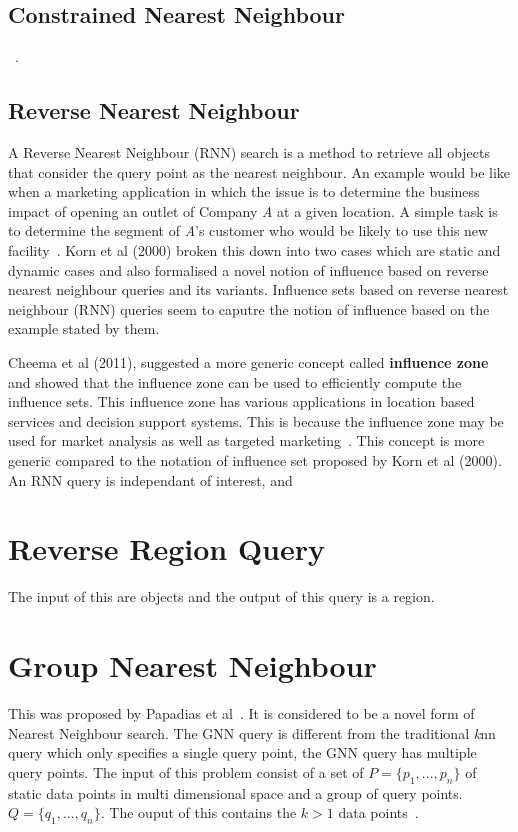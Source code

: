 \documentclass[a4paper,11pt]{article}
\begin{document}
\subsection{Constrained Nearest Neighbour}

~\cite{ferhatosmanoglu2001constrained}.

\subsection{Reverse Nearest Neighbour}

A Reverse Nearest Neighbour (RNN) search is a method to retrieve all objects
that consider the query point as the nearest neighbour. An example would be
like when a marketing application in which the issue is to determine the
business impact of opening an outlet of Company \textit{A} at a given
location. A simple task is to determine the segment of \textit{A}'s customer
who would be likely to use this new facility~\cite{korn2000influence}. Korn et
al (2000) broken this down into two cases which are static and dynamic cases
and also formalised a novel notion of influence based on reverse nearest
neighbour queries and its variants. Influence sets based on reverse nearest
neighbour (RNN) queries seem to caputre the notion of influence based on the
example stated by them.

Cheema et al (2011), suggested a more generic concept called \textbf{influence
zone} and showed that the influence zone can be used to efficiently compute
the influence sets. This influence zone has various applications in location
based services and decision support systems. This is because the influence
zone may be used for market analysis as well as targeted
marketing~\cite{cheema2011influence}. This concept is more generic compared to
the notation of influence set proposed by Korn et al (2000). An RNN query is
independant of interest, and

\section{Reverse Region Query}

The input of this are objects and the output of this query is a region. 

\section{Group Nearest Neighbour} 

This was proposed by Papadias et al~\cite{papadias2004group}. It is considered
to be a novel form of Nearest Neighbour search. The GNN query is different
from the traditional \textit{k}nn query which only specifies a single query
point, the GNN query has multiple query points. The input of this problem
consist of  a set of $P=\{p_1,...,p_n\}$ of static data points in multi
dimensional space and a group of query points. $Q=\{q_1,...,q_n\}$. The ouput
of this contains the $k>1$ data points~\cite{papadias2004group}.
\end{document}
